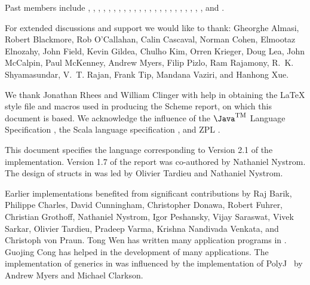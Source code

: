 Past members include
, 
, 
, 
, 
, 
, 
, 
, 
,
, 
, 
, 
, 
,
,
,  
, 
, 
,
,
, 
,
, and
.

For extended discussions and support we would like to thank: 
Gheorghe Almasi,
Robert Blackmore,
Rob O'Callahan, 
Calin Cascaval, 
Norman Cohen, 
Elmootaz Elnozahy, 
John Field,
Kevin Gildea,
Chulho Kim,
Orren Krieger, 
Doug Lea, 
John McCalpin, 
Paul McKenney, 
Andrew Myers,
Filip Pizlo, 
Ram Rajamony,
R.~K. Shyamasundar, 
V.~T. Rajan, 
Frank Tip,
Mandana Vaziri,
and
Hanhong Xue.


We thank Jonathan Rhees and William Clinger with help in obtaining the
\LaTeX{} style file and macros used in producing the Scheme report,
on which this document is based. We acknowledge the influence of
the $\mbox{\Java}^{\mbox{\textsc{tm}}}$ Language
Specification \cite{jls2}, the Scala language specification
\cite{scala}, and ZPL \cite{ZPL}.

This document specifies the language corresponding to Version
2.1 of the implementation. Version 1.7 of the report was co-authored by
Nathaniel Nystrom. The design of structs in \Xten{} was led by Olivier Tardieu
and Nathaniel Nystrom.

Earlier implementations benefited from significant contributions by
Raj Barik, 
Philippe Charles, 
David Cunningham,
Christopher Donawa, 
Robert Fuhrer,
Christian Grothoff,
Nathaniel Nystrom,  
Igor Peshansky,  
Vijay Saraswat,
Vivek Sarkar, 
Olivier Tardieu,  
Pradeep Varma, 
Krishna Nandivada Venkata, and
Christoph von Praun.
Tong Wen has written many application programs
in \Xten{}. Guojing Cong has helped in the
development of many applications.
The implementation of generics in \Xten{} was influenced by the
implementation of PolyJ~\cite{polyj} by Andrew Myers and Michael Clarkson.

